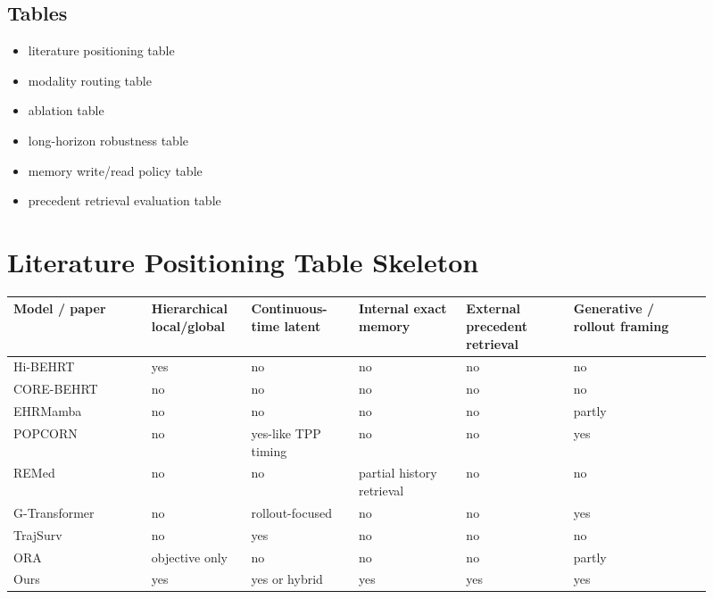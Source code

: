 \documentclass[11pt]{article}
\begin{document}
\subsection{Tables}

\begin{itemize}
    \item literature positioning table
    \item modality routing table
    \item ablation table
    \item long-horizon robustness table
    \item memory write/read policy table
    \item precedent retrieval evaluation table
\end{itemize}

\section{Literature Positioning Table Skeleton}

\begin{center}
\begin{tabular}{p{0.18\linewidth}p{0.13\linewidth}p{0.14\linewidth}p{0.14\linewidth}p{0.14\linewidth}p{0.18\linewidth}}
\hline
Model / paper & Hierarchical local/global & Continuous-time latent & Internal exact memory & External precedent retrieval & Generative / rollout framing \\
\hline
Hi-BEHRT \cite{li2021hibehrt} & yes & no & no & no & no \\
CORE-BEHRT \cite{odgaard2024corebehrt} & no & no & no & no & no \\
EHRMamba \cite{fallahpour2025ehrmamba} & no & no & no & no & partly \\
POPCORN \cite{bhave2021popcorn} & no & yes-like TPP timing & no & no & yes \\
REMed \cite{kim2024remed} & no & no & partial history retrieval & no & no \\
G-Transformer \cite{xiong2024gtransformer} & no & rollout-focused & no & no & yes \\
TrajSurv \cite{zeng2025trajsurv} & no & yes & no & no & no \\
ORA \cite{jing2026ora} & objective only & no & no & no & partly \\
Ours & yes & yes or hybrid & yes & yes & yes \\
\hline
\end{tabular}
\end{center}
\end{document}
